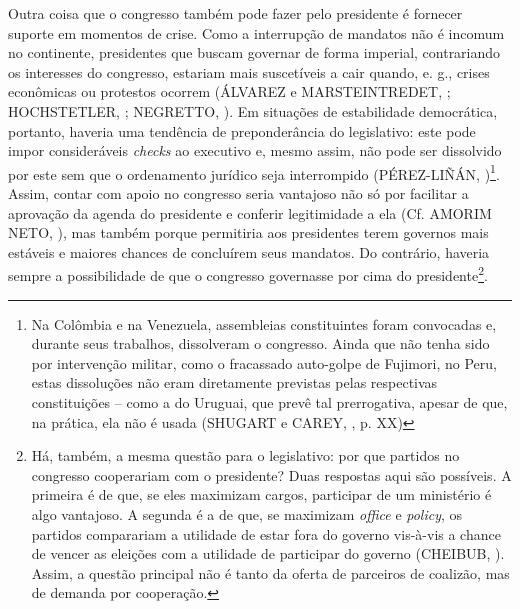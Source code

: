 Outra coisa que o congresso também pode fazer pelo presidente é fornecer suporte em momentos de crise. Como a interrupção de mandatos não é incomum no continente, presidentes que buscam governar de forma imperial, contrariando os interesses do congresso, estariam mais suscetíveis a cair quando, e. g., crises econômicas ou protestos ocorrem (ÁLVAREZ e MARSTEINTREDET, \citeyear{alvarez2010}; HOCHSTETLER, \citeyear{hochstetler2006}; NEGRETTO, \citeyear{negretto2006}). Em situações de estabilidade democrática, portanto, haveria uma tendência de preponderância do legislativo: este pode impor consideráveis \textit{checks} ao executivo e, mesmo assim, não pode ser dissolvido por este sem que o ordenamento jurídico seja interrompido (PÉREZ-LIÑÁN, \citeyear{perez2005})\footnote{Na Colômbia e na Venezuela, assembleias constituintes foram convocadas e, durante seus trabalhos, dissolveram o congresso. Ainda que não tenha sido por intervenção militar, como o fracassado auto-golpe de Fujimori, no Peru, estas dissoluções não eram diretamente previstas pelas respectivas constituições -- como a do Uruguai, que prevê tal prerrogativa, apesar de que, na prática, ela não é usada (SHUGART e CAREY, \citeyear{shugart1992}, p. XX)}. Assim, contar com apoio no congresso seria vantajoso não só por facilitar a aprovação da agenda do presidente e conferir legitimidade a ela (Cf. AMORIM NETO, \citeyear{neto2006}), mas também porque permitiria aos presidentes terem governos mais estáveis e maiores chances de concluírem seus mandatos. Do contrário, haveria sempre a possibilidade de que o congresso governasse por cima do presidente\footnote{Há, também, a mesma questão para o legislativo: por que partidos no congresso cooperariam com o presidente? Duas respostas aqui são possíveis. A primeira é de que, se eles maximizam cargos, participar de um ministério é algo vantajoso. A segunda é a de que, se maximizam \textit{office} e \textit{policy}, os partidos comparariam a utilidade de estar fora do governo vis-à-vis a chance de vencer as eleições com a utilidade de participar do governo (CHEIBUB, \citeyear{cheibub2007}). Assim, a questão principal não é tanto da oferta de parceiros de coalizão, mas de demanda por cooperação.}.

